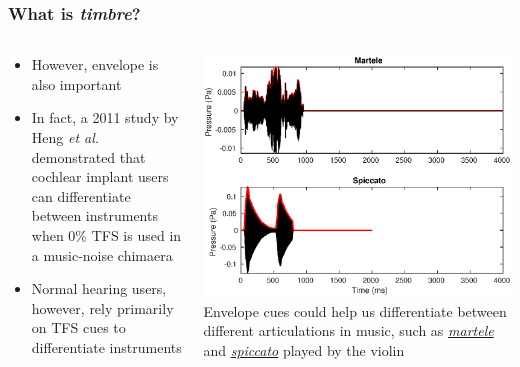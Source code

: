\documentclass[aspectratio=1610]{beamer}
\begin{document}
\begin{frame}
\frametitle{What is \textit{timbre}?}

\begin{columns}
\begin{column}{0.4\textwidth}
\begin{itemize}[label = $\blacktriangleright$]
\item However, envelope is also important\vspace{.5em}
\item In fact, a 2011 study by Heng \textit{et al.} demonstrated that cochlear implant users can differentiate between instruments when 0\% TFS is used in a music-noise chimaera\vspace{.5em}
\item Normal hearing users, however, rely primarily on TFS cues to differentiate instruments
\end{itemize}
\end{column}
\begin{column}{0.6\textwidth}
\includegraphics[width = 1.0\textwidth]{martele_spiccato_compare}
\centering
Envelope cues could help us differentiate between different articulations in music, such as \href{./Audio/martele.mp3}{\textit{martele}} and \href{./Audio/spiccato.mp3}{\textit{spiccato}} played by the violin
\end{column}
\end{columns}

\end{frame}
\end{document}
